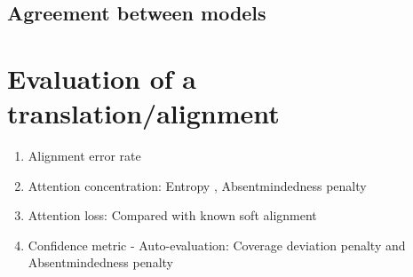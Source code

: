\documentclass{article}
\begin{document}
\subsection{Agreement between models}

\section{Evaluation of a translation/alignment}
\begin{enumerate}
\item Alignment error rate
\item Attention concentration: Entropy \citep{Ghader2017what}, Absentmindedness penalty \citep{Rikters2017confidence}
\item Attention loss: Compared with known soft alignment
\item Confidence metric - Auto-evaluation: Coverage deviation penalty and Absentmindedness penalty \citep{Rikters2017confidence}

\end{enumerate}


\pagebreak 



\end{document}
